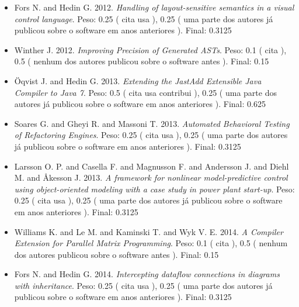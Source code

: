 \begin{itemize}
\item Fors N. and Hedin G.
      2012.
        \textit{ Handling of layout-sensitive semantics in a visual control language}.
      Peso:
      0.25 (
          cita
          usa
      ),
      0.25 (
uma parte dos autores já publicou sobre o software em anos anteriores
      ).
      Final:
      0.3125

\item Winther J.
      2012.
        \textit{ Improving Precision of Generated ASTs}.
      Peso:
      0.1 (
          cita
      ),
      0.5 (
nenhum dos autores publicou sobre o software antes
      ).
      Final:
      0.15

\item \"{O}qvist J. and Hedin G.
      2013.
        \textit{ Extending the JastAdd Extensible Java Compiler to Java 7}.
      Peso:
      0.5 (
          cita
          usa
          contribui
      ),
      0.25 (
uma parte dos autores já publicou sobre o software em anos anteriores
      ).
      Final:
      0.625

\item Soares G. and Gheyi R. and Massoni T.
      2013.
        \textit{ Automated Behavioral Testing of Refactoring Engines}.
      Peso:
      0.25 (
          cita
          usa
      ),
      0.25 (
uma parte dos autores já publicou sobre o software em anos anteriores
      ).
      Final:
      0.3125

\item Larsson O. P. and Casella F. and Magnusson F. and Andersson J. and Diehl M. and Åkesson J.
      2013.
        \textit{ A framework for nonlinear model-predictive control using object-oriented modeling with a case study in power plant start-up}.
      Peso:
      0.25 (
          cita
          usa
      ),
      0.25 (
uma parte dos autores já publicou sobre o software em anos anteriores
      ).
      Final:
      0.3125

\item Williams K. and Le M. and Kaminski T. and Wyk V. E.
      2014.
        \textit{ A Compiler Extension for Parallel Matrix Programming}.
      Peso:
      0.1 (
          cita
      ),
      0.5 (
nenhum dos autores publicou sobre o software antes
      ).
      Final:
      0.15

\item Fors N. and Hedin G.
      2014.
        \textit{ Intercepting dataflow connections in diagrams with inheritance}.
      Peso:
      0.25 (
          cita
          usa
      ),
      0.25 (
uma parte dos autores já publicou sobre o software em anos anteriores
      ).
      Final:
      0.3125


\end{itemize}
